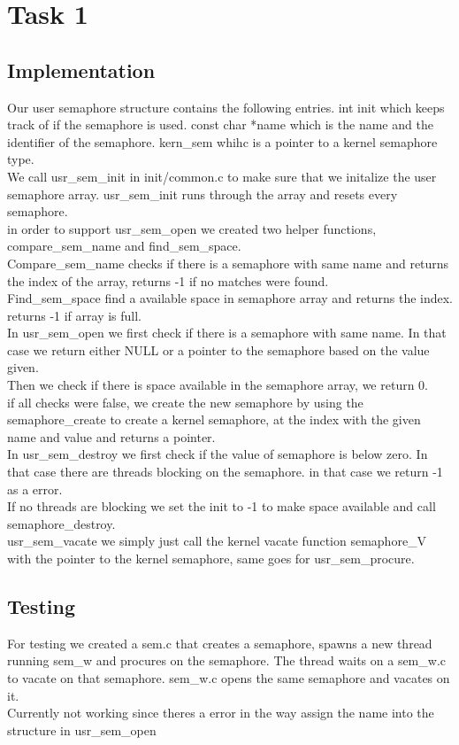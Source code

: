 \documentclass[12pt]{article}
\begin{document}
\section*{Task 1}
\subsection*{Implementation}
Our user semaphore structure contains the following entries. int init which keeps track of if the semaphore is used. const char *name which is the name and the identifier of the semaphore.
kern\_sem whihc is a pointer to a kernel semaphore type.\\
We call usr\_sem\_init in init/common.c to make sure that we initalize the user semaphore array. usr\_sem\_init runs through the array and resets every semaphore.\\
in order to support usr\_sem\_open we created two helper functions, compare\_sem\_name and find\_sem\_space. \\Compare\_sem\_name checks if there is a semaphore with same name and returns the index of the array, returns -1 if no matches were found. \\Find\_sem\_space find a available space in semaphore array and returns the index. returns -1 if array is full.\\
 In usr\_sem\_open we first check if there is a semaphore with same name. In that case we return either NULL or a pointer to the semaphore based on the value given.\\
 Then we check if there is space available in the semaphore array, we return 0.\\
 if all checks were false, we create the new semaphore by using the semaphore\_create to create a kernel semaphore, at the index with the given name and value and returns a pointer.\\
In usr\_sem\_destroy we first check if the value of semaphore is below zero. In that case there are threads blocking on the semaphore. in that case we return -1 as a error.\\
If no threads are blocking we set the init to -1 to make space available and call semaphore\_destroy.\\
usr\_sem\_vacate we simply just call the kernel vacate function semaphore\_V with the pointer to the kernel semaphore, same goes for usr\_sem\_procure.\\
\subsection*{Testing}
For testing we created a sem.c that creates a semaphore, spawns a new thread running sem\_w and procures on the semaphore. 
The thread waits on a sem\_w.c to vacate on that semaphore. sem\_w.c opens the same semaphore and vacates on it.
\\ Currently not working since theres a error in the way assign the name into the structure in usr\_sem\_open 
\end{document}

